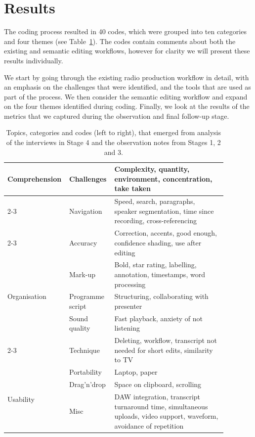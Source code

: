 \section{Results}

The coding process resulted in 40 codes, which were grouped into ten categories and four themes (see
Table~\ref{tab:codes}). The codes contain comments about both the existing and semantic editing workflows, however for
clarity we will present these results individually.

We start by going through the existing radio production workflow in detail, with an emphasis on the challenges that
were identified, and the tools that are used as part of the process. We then consider the semantic editing workflow and
expand on the four themes identified during coding. Finally, we look at the results of the metrics that we captured
during the observation and final follow-up stage.

\begin{table}[h]
\centering
{\small
\begin{tabular}{|p{0.18\linewidth}|p{0.2\linewidth}|p{0.5\linewidth}|}
\hline
\multirow{5}{*}{Comprehension}
 & Challenges & Complexity, quantity, environment, concentration, take taken \\ \cline{2-3}
 & Navigation & Speed, search, paragraphs, speaker segmentation, time since recording, cross-referencing \\ \cline{2-3} 
 & Accuracy & Correction, accents, good enough, confidence shading, use after editing \\ \hline 
\multirow{3}{*}{Organisation}
 & Mark-up & Bold, star rating, labelling, annotation, timestamps, word processing \\ \cline{2-3} 
 & Programme script & Structuring, collaborating with presenter \\ \hline 
\multirow{2}{*}{Editing}
 & Sound quality & Fast playback, anxiety of not listening \\ \cline{2-3}
 & Technique & Deleting, workflow, transcript not needed for short edits, similarity to TV \\ \hline
\multirow{3}{*}{Usability}
 & Portability & Laptop, paper \\ \cline{2-3} 
 & Drag'n'drop & Space on clipboard, scrolling \\ \cline{2-3} 
 & Misc & DAW integration, transcript turnaround time, simultaneous uploads, video support, waveform, avoidance of repetition \\ \hline
\end{tabular}
}
\caption{Topics, categories and codes (left to right), that emerged from analysis of the interviews in Stage 4 and the
observation notes from Stages 1, 2 and 3.}
\label{tab:codes}
\end{table}

